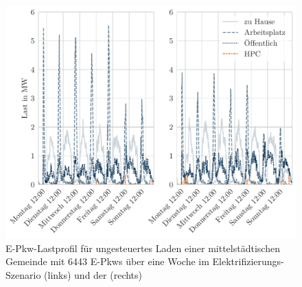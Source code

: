 \begin{figure}[H]
    \centering
    \includegraphics[width=\textwidth]{Bilder/example_load_profile}
    \caption{E-Pkw-Lastprofil für ungesteuertes Laden einer mittelstädtischen Gemeinde mit \num{6443} E-Pkws über eine Woche im Elektrifizierungs-Szenario (links) und der \SzeFirmenparkplatz (rechts)}\label{fig:example_load_profile}
\end{figure}